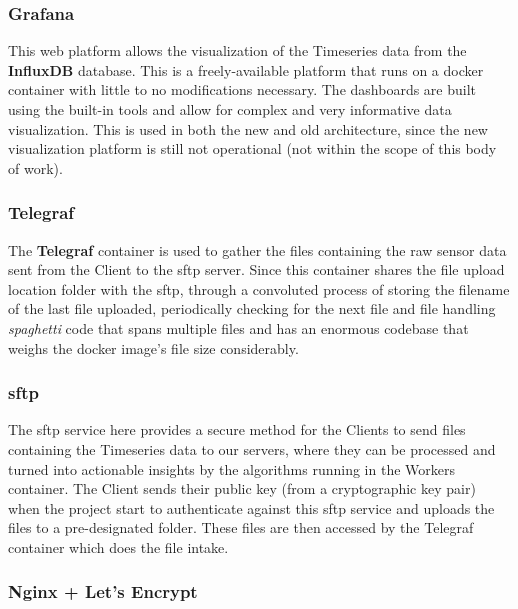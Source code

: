 \subsubsection{Grafana}\label{methodology:sss:grafana}

This web platform allows the visualization of the Timeseries data from the \textbf{InfluxDB} database. This is a freely-available platform that runs on a docker container with little to no modifications necessary. The dashboards are built using the built-in tools and allow for complex and very informative data visualization. This is used in both the new and old architecture, since the new visualization platform is still not operational (not within the scope of this body of work).

\subsubsection{Telegraf}\label{methodology:sss:telegraf}

The \textbf{Telegraf} container is used to gather the files containing the raw sensor data sent from the Client to the \gls{sftp} server. Since this container shares the file upload location folder with the \gls{sftp}, through a convoluted process of storing the filename of the last file uploaded, periodically checking for the next file and file handling \textit{spaghetti} code that spans multiple files and has an enormous codebase that weighs the docker image's file size considerably. 

\subsubsection{\gls{sftp}}\label{methodology:sss:sftp}

The \gls{sftp} service here provides a secure method for the Clients to send files containing the Timeseries data to our servers, where they can be processed and turned into actionable insights by the algorithms running in the Workers container. The Client sends their public key (from a cryptographic key pair) when the project start to authenticate against this \gls{sftp} service and uploads the files to a pre-designated folder. These files are then accessed by the Telegraf container which does the file intake.


\subsubsection{Nginx + Let's Encrypt}\label{methodology:sss:nginxletsencrypt}

